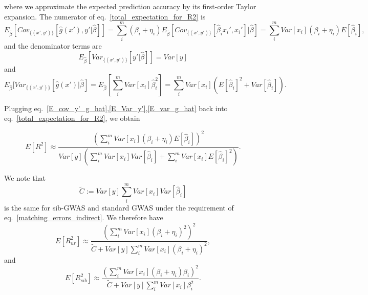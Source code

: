 \documentclass[hidelinks, 12pt]{article}
\begin{document}
where we approximate the expected prediction accuracy by its first-order Taylor expansion.  The numerator  of eq.~\ref{total_expectation_for_R2} is 
\begin{equation}
\label{E_cov_y'_g_hat}
E_{\hat{\beta}}[Cov_{\{(x',y')\}}[\hat{g}(x'),y'|\hat{\beta}]]=\sum_i^m(\beta_i+\eta_i)E_{\hat{\beta}}[Cov_{\{(x',y')\}}[\hat{\beta}_ix_i',x_i']|\hat{\beta}] = \sum_i^m Var[x_i](\beta_i+\eta_i)E[\hat{\beta}_i],
\end{equation}
and the denominator terms are 
\begin{equation}
\label{E_Var_y'}
E_{\hat{\beta}}[Var_{\{(x',y')\}}[y'|\hat{\beta}]] = Var[y]
\end{equation}
and
\begin{equation}
\label{E_var_g_hat}
E_{\hat{\beta}}[Var_{\{(x',y')\}}[\hat{g}(x')|\hat{\beta}] = E_{\hat{\beta}}[\sum_i^mVar[x_i]\hat{\beta}_i^2] =
\sum_i^mVar[x_i](E[\hat{\beta}_i]^2+Var[\hat{\beta}_i]).
\end{equation}

Plugging eq.~\ref{E_cov_y'_g_hat},\ref{E_Var_y'},\ref{E_var_g_hat} back into eq.~\ref{total_expectation_for_R2}, we obtain

\begin{equation}
\label{R_indirect_general_form}
E[R^2] \approx \frac{(\sum_i^mVar[x_i](\beta_i+\eta_i)E[\hat{\beta}_i])^2}{Var[y](\sum_i^mVar[x_i]Var[\hat{\beta}_i]+\sum_i^mVar[x_i]E[\hat{\beta}_i]^2)}.
\end{equation}

We note that 
$$\tilde{C}:=Var[y]\sum_i^m Var[x_i] Var[\hat{\beta}_i]$$
is the same for sib-GWAS and standard GWAS under the requirement of eq.~\ref{matching_errors_indirect}.  We therefore have 
\begin{equation}
\label{R_indirect_unrelated_longform}
E[R_{ur}^2] \approx \frac{(\sum_i^mVar[x_i](\beta_i+\eta_i)^2)^2}{\tilde{C}+ Var[y]\sum_i^mVar[x_i](\beta_i+\eta_i)^2},
\end{equation}
and
\begin{equation}
\label{R_indirect_sibs_longform}
E[R_{sib}^2] \approx \frac{(\sum_i^mVar[x_i](\beta_i+\eta_i)\beta_i)^2}{\tilde{C}+ Var[y]\sum_i^mVar[x_i]\beta_i^2}.
\end{equation}
\end{document}
